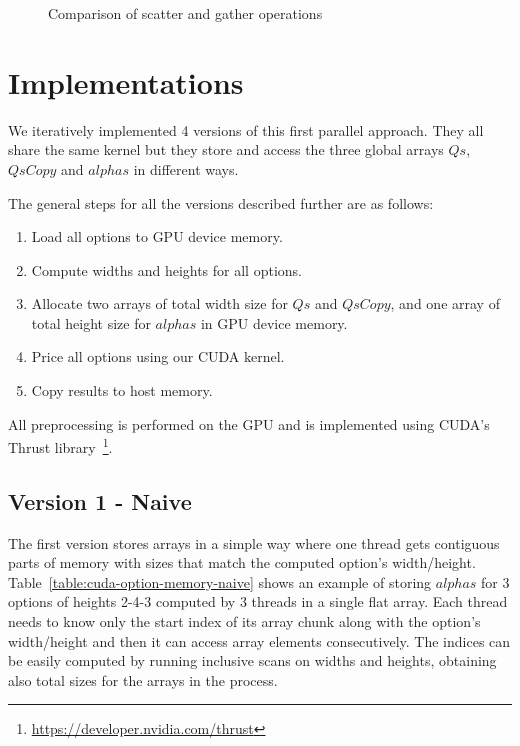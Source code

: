 \begin{figure}[H]
    \centering
    \def\svgwidth{0.8\textwidth}
	\caption{Comparison of scatter and gather operations}
    
	\label{fig:scattervsgather}
\end{figure}

\section{Implementations}
We iteratively implemented 4 versions of this first parallel approach. They all share the same kernel but they store and access the three global arrays $\mathit{Qs}$, $\mathit{QsCopy}$ and $\mathit{alphas}$ in different ways.

The general steps for all the versions described further are as follows:
\begin{enumerate}
    \item Load all options to GPU device memory.
    \item Compute widths and heights for all options.
    \item Allocate two arrays of total width size for $\mathit{Qs}$ and $\mathit{QsCopy}$, and one array of total height size for $\mathit{alphas}$ in GPU device memory.
    \item Price all options using our CUDA kernel.
    \item Copy results to host memory.
\end{enumerate}

All preprocessing is performed on the GPU and is implemented using CUDA's Thrust library~\footnote{\url{https://developer.nvidia.com/thrust}}.

\subsection*{Version 1 - Naive}
The first version stores arrays in a simple way where one thread gets contiguous parts of memory with sizes that match the computed option's width/height. Table~\ref{table:cuda-option-memory-naive} shows an example of storing $\mathit{alphas}$ for 3 options of heights 2-4-3 computed by 3 threads in a single flat array. Each thread needs to know only the start index of its array chunk along with the option's width/height and then it can access array elements consecutively. The indices can be easily computed by running inclusive scans on widths and heights, obtaining also total sizes for the arrays in the process.

